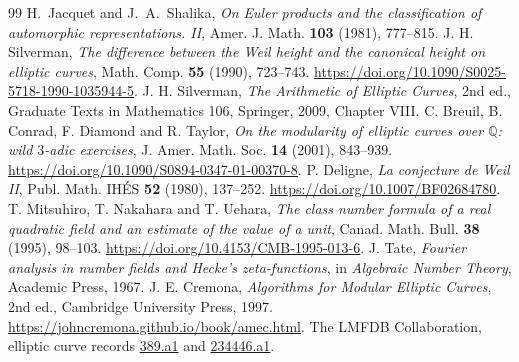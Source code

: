 \documentclass[11pt]{article}
\newcommand{\Q}{\mathbb{Q}}
\begin{document}
\raggedright
\begin{thebibliography}{99}
H.~Jacquet and J.~A.~Shalika, \emph{On Euler products and the
classification of automorphic representations. II},
Amer. J. Math. \textbf{103} (1981), 777--815.
J. H. Silverman, \emph{The difference between the Weil height and the canonical height on elliptic curves},
Math. Comp. \textbf{55} (1990), 723--743.
\url{https://doi.org/10.1090/S0025-5718-1990-1035944-5}.
J. H. Silverman, \emph{The Arithmetic of Elliptic Curves}, 2nd ed.,
Graduate Texts in Mathematics 106, Springer, 2009, Chapter VIII.
C. Breuil, B. Conrad, F. Diamond and R. Taylor,
\emph{On the modularity of elliptic curves over $\Q$: wild $3$-adic exercises},
J. Amer. Math. Soc. \textbf{14} (2001), 843--939.
\url{https://doi.org/10.1090/S0894-0347-01-00370-8}.
P. Deligne, \emph{La conjecture de Weil II},
Publ. Math. IH\'ES \textbf{52} (1980), 137--252.
\url{https://doi.org/10.1007/BF02684780}.
T. Mitsuhiro, T. Nakahara and T. Uehara, \emph{The class number formula of a real quadratic field and an estimate of the value of a unit},
Canad. Math. Bull. \textbf{38} (1995), 98--103.
\url{https://doi.org/10.4153/CMB-1995-013-6}.
J. Tate, \emph{Fourier analysis in number fields and Hecke's zeta-functions},
in \emph{Algebraic Number Theory}, Academic Press, 1967.
J. E. Cremona, \emph{Algorithms for Modular Elliptic Curves}, 2nd ed.,
Cambridge University Press, 1997. \url{https://johncremona.github.io/book/amec.html}.
The LMFDB Collaboration, elliptic curve records
\href{https://www.lmfdb.org/EllipticCurve/Q/389/a/1}{389.a1} and
\href{https://www.lmfdb.org/EllipticCurve/Q/234446/a/1}{234446.a1}.
\end{thebibliography}
\end{document}
